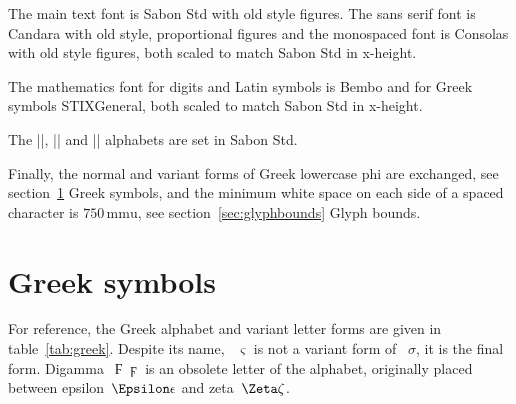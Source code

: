\documentclass{ltxdockit}
\begin{document}
The main text font is Sabon  Std with old style figures. The sans serif font is Candara with old style, proportional figures and the monospaced font is Consolas with old style figures, both scaled to match Sabon  Std in x-height.

The mathematics font for digits and Latin symbols is Bembo  and for Greek symbols STIXGeneral, both scaled to match Sabon  Std in x-height.

The |\mathrm|, |\mathit| and |\mathbf| alphabets are set in Sabon  Std.

Finally, the normal and variant forms of Greek lowercase phi are exchanged, see section~\ref{sec:greek} Greek symbols, and the minimum white space on each side of a spaced character is $750\,\mathrm{mmu}$, see section~\ref{sec:glyphbounds} Glyph bounds.

\section{Greek symbols}\label{sec:greek}

For reference, the Greek alphabet and variant letter forms are given in table~\ref{tab:greek}. Despite its name, ~$\varsigma$ is not a variant form of ~$\sigma$, it is the final form. Digamma~$\Digamma\digamma$ is an obsolete letter of the alphabet, originally placed between epsilon~$\Epsilon\epsilon$ and zeta~$\Zeta\zeta$.
\end{document}
